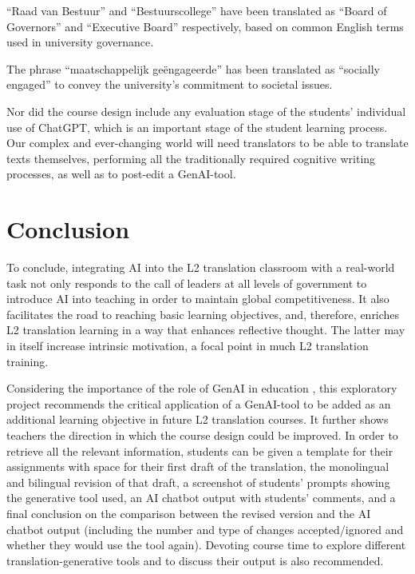 \documentclass[output=paper]{langscibook}
\begin{document}
“Raad van Bestuur” and “Bestuurscollege” have been translated as “Board of Governors” and “Executive Board” respectively, based on common English terms used in university governance.

The phrase “maatschappelijk geëngageerde” has been translated as “socially engaged” to convey the university's commitment to societal issues. 

\citep{gemini2024}
\z

Nor did the course design include any evaluation stage of the students’ individual use of ChatGPT, which is an important stage of the student learning process. Our complex and ever-changing world will need translators to be able to translate texts themselves, performing all the traditionally required cognitive writing processes, as well as to post-edit a GenAI-tool. 

\section{Conclusion}

To conclude, integrating AI into the L2 translation classroom with a real-world task not only responds to the call of leaders at all levels of government to introduce AI into teaching in order to maintain global competitiveness. It also facilitates the road to reaching basic learning objectives, and, therefore, enriches L2 translation learning in a way that enhances reflective thought. The latter may in itself increase intrinsic motivation, a focal point in much L2 translation training. 

Considering the importance of the role of GenAI in education \citep{labadze23}, this exploratory project recommends the critical application of a GenAI-tool to be added as an additional learning objective in future L2 translation courses. It further shows teachers the direction in which the course design could be improved. In order to retrieve all the relevant information, students can be given a template for their assignments with space for their first draft of the translation, the monolingual and bilingual revision of that draft, a screenshot of students’ prompts showing the generative tool used, an AI chatbot output with students’ comments, and a final conclusion on the comparison between the revised version and the AI chatbot output (including the number and type of changes accepted/ignored and whether they would use the tool again). Devoting course time to explore different translation-generative tools and to discuss their output is also recommended. 
\end{document}
